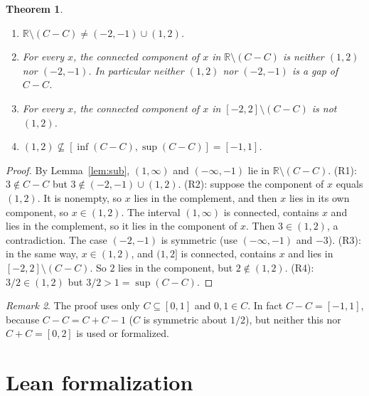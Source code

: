 \documentclass[11pt]{article}
\newtheorem{theorem}{Theorem}
\theoremstyle{definition}
\theoremstyle{remark}
\newtheorem{remark}[theorem]{Remark}
\begin{document}
\begin{theorem}\label{thm:main}
\begin{enumerate}
\item[(R1)] $\mathbb R\setminus(C-C)\ne(-2,-1)\cup(1,2)$.
\item[(R2)] For every $x$, the connected component of $x$ in $\mathbb R\setminus(C-C)$ is neither
$(1,2)$ nor $(-2,-1)$. In particular neither $(1,2)$ nor $(-2,-1)$ is a gap of $C-C$.
\item[(R3)] For every $x$, the connected component of $x$ in $[-2,2]\setminus(C-C)$ is not $(1,2)$.
\item[(R4)] $(1,2)\not\subseteq[\inf(C-C),\sup(C-C)]=[-1,1]$.
\end{enumerate}
\end{theorem}
\begin{proof}
By Lemma~\ref{lem:sub}, $(1,\infty)$ and $(-\infty,-1)$ lie in $\mathbb R\setminus(C-C)$.
(R1): $3\notin C-C$ but $3\notin(-2,-1)\cup(1,2)$.
(R2): suppose the component of $x$ equals $(1,2)$. It is nonempty, so $x$ lies in the complement,
and then $x$ lies in its own component, so $x\in(1,2)$. The interval $(1,\infty)$ is connected,
contains $x$ and lies in the complement, so it lies in the component of $x$. Then $3\in(1,2)$, a
contradiction. The case $(-2,-1)$ is symmetric (use $(-\infty,-1)$ and $-3$).
(R3): in the same way, $x\in(1,2)$, and $(1,2]$ is connected, contains $x$ and lies in
$[-2,2]\setminus(C-C)$. So $2$ lies in the component, but $2\notin(1,2)$.
(R4): $3/2\in(1,2)$ but $3/2>1=\sup(C-C)$.
\end{proof}

\begin{remark}
The proof uses only $C\subseteq[0,1]$ and $0,1\in C$. In fact $C-C=[-1,1]$, because
$C-C=C+C-1$ ($C$ is symmetric about $1/2$), but neither this nor $C+C=[0,2]$ is used or
formalized.
\end{remark}

\section{Lean formalization}
\end{document}
